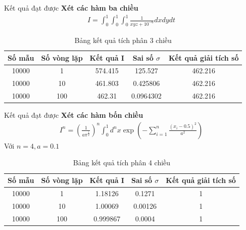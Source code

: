 \documentclass{beamer}
\begin{document}
\begin{frame}{Kết quả đạt được}\vspace{4pt}
  \textbf{Xét các hàm ba chiều}\\
  \vspace{0.4em}
  \begin{align}
    I=\int_{0}^{1}\int_{0}^{1} \int_{0}^{1} {\frac{1}{xyz+10^{-6}}}dxdydt
\end{align}
\begin{table}[H]
    \centering
    \begin{tabular}{ |c|c|c|c|c| }
     \hline
     \multicolumn{1}{|c}{Số mẫu} & \multicolumn{1}{|c|}{Số vòng lặp} & \multicolumn{1}{|c|}{Kết quả I} & \multicolumn{1}{|c|}{Sai số $\sigma$} & \multicolumn{1}{|c|}{Kết quả giải tích số} \\
     \hline
     10000 & 1  & 574.415  & 125.527 & 462.216 \\
     \hline
     10000 & 10  & 461.803  & 0.425806 & 462.216 \\
     \hline
     10000 & 100  & 462.31 & 0.0964302 & 462.216 \\
     \hline
    \end{tabular}
    \caption{Bảng kết quả tích phân 3 chiều}
    \label{3d_xyz}
   \end{table}
\end{frame}

\begin{frame}{Kết quả đạt được}\vspace{4pt}
  \textbf{Xét các hàm bốn chiều}\\
  \vspace{0.4em}
  \begin{align}
    I^n=\left(\frac{1}{a{\pi}^{\frac{1}{2}}}\right)^n\int_{0}^{1} 
    {d^nx\exp\left({-\sum_{i=1}^n{\frac{(x_i-0.5)^2}{a^2}}}\right)}
\end{align}
Với $n=4, a=0.1$
\begin{table}[H]
    \centering
    \begin{tabular}{ |c|c|c|c|c| }
     \hline
     \multicolumn{1}{|c}{Số mẫu} & \multicolumn{1}{|c|}{Số vòng lặp} & \multicolumn{1}{|c|}{Kết quả I} & \multicolumn{1}{|c|}{Sai số $\sigma$} & \multicolumn{1}{|c|}{Kết quả giải tích số} \\
     \hline
     10000 & 1  &  1.18126 & 0.1271 & 1 \\
     \hline
     10000 & 10  & 1.00069 & 0.00126 & 1 \\
     \hline
     10000 & 100  & 0.999867 & 0.0004 & 1 \\
     \hline
    \end{tabular}
    \caption{Bảng kết quả tích phân 4 chiều}
    \label{4d_xyzt}
   \end{table}
\end{frame}
\end{document}

